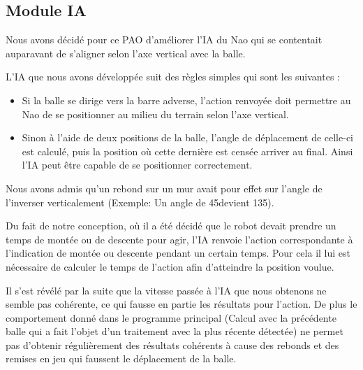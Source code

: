 \subsection{Module IA}
\label{sub:Module IA}
\par Nous avons décidé pour ce PAO d'améliorer l'IA du Nao qui se contentait
auparavant de s'aligner selon l'axe vertical avec la balle.

\par L'IA que nous avons développée suit des règles simples qui sont les
suivantes :

\begin{itemize}
	\item Si la balle se dirige vers la barre adverse, l'action renvoyée doit
		permettre au Nao de se positionner au milieu du terrain selon l'axe
		vertical.
	\item Sinon à l'aide de deux positions de la balle, l'angle de déplacement
		de celle-ci est calculé, puis la position où cette dernière est censée
		arriver au final. Ainsi l'IA peut être capable de se positionner
		correctement.
\end{itemize}

\par Nous avons admis qu'un rebond sur un mur avait pour effet sur l'angle de
l'inverser verticalement (Exemple: Un angle de 45\degre devient 135\degre).

\par Du fait de notre conception, où il a été décidé que le robot devait
prendre un temps de montée ou de descente pour agir, l'IA renvoie l'action correspondante
à l'indication de montée ou descente pendant un certain temps.
Pour cela il lui est nécessaire de calculer le temps de l'action afin
d'atteindre la position voulue.

\par Il s'est révélé par la suite que la vitesse passée à l'IA que nous obtenons ne
semble pas cohérente, ce qui fausse en partie les résultats pour l'action. De plus
le comportement donné dans le programme principal (Calcul avec la précédente balle
qui a fait l'objet d'un traitement avec la plus récente détectée) ne permet pas
d'obtenir régulièrement des résultats cohérents à cause des rebonds et des remises
en jeu qui faussent le déplacement de la balle.

